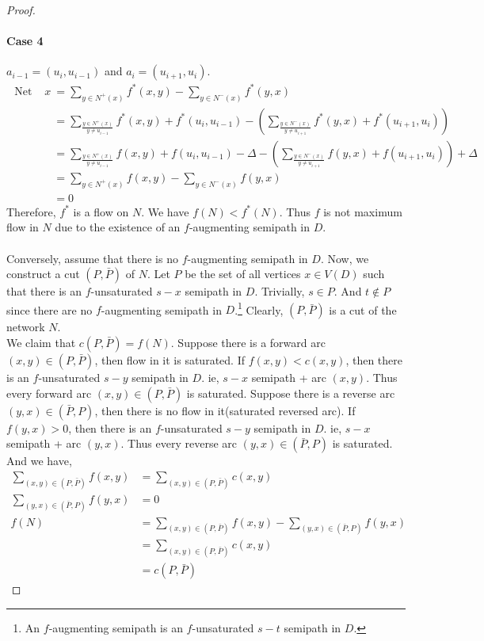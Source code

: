 \begin{proof}
	\paragraph{Case 4} $a_{i-1} = (u_i,u_{i-1})$ and $a_i = (u_{i+1},u_i)$.
	\begin{align*}
		\text{ Net flow out of } x
		& = \sum_{y \in N^+(x)} f^*(x,y) - \sum_{y \in N^-(x)} f^*(y,x) \\
		& = \sum_{\frac{y \in N^+(x)}{y \ne u_{i-1}}} f^*(x,y) + f^*(u_i,u_{i-1}) - \left( \sum_{\frac{y \in N^-(x)}{y \ne u_{i+1}}} f^*(y,x) + f^*(u_{i+1},u_i) \right)\\
		& = \sum_{\frac{y \in N^+(x)}{y \ne u_{i-1}}} f(x,y) + f(u_i,u_{i-1}) - \Delta - \left( \sum_{\frac{y \in N^-(x)}{y \ne u_{i+1}}} f(y,x) + f(u_{i+1},u_i) \right) + \Delta \\
		& = \sum_{y \in N^+(x)} f(x,y) - \sum_{y \in N^-(x)} f(y,x) \\
		& = 0
	\end{align*}
	Therefore, $f^*$ is a flow on $N$. We have $f(N) < f^*(N)$. Thus $f$ is not maximum flow in $N$ due to the existence of an $f$-augmenting semipath in $D$.

	\paragraph{}Conversely, assume that there is no $f$-augmenting semipath in $D$. Now, we construct a cut $(P,\bar{P})$ of $N$. Let $P$ be the set of all vertices $x \in V(D)$ such that there is an $f$-unsaturated $s-x$ semipath in $D$. Trivially, $s \in P$. And $t \not\in P$ since there are no $f$-augmenting semipath in $D$.\footnote{An $f$-augmenting semipath is an $f$-unsaturated $s-t$ semipath in $D$.} Clearly, $(P,\bar{P})$ is a cut of the network $N$.\\

	We claim that $c(P,\bar{P}) = f(N)$. Suppose there is a forward arc $(x,y) \in (P,\bar{P})$, then flow in it is saturated. If $f(x,y) < c(x,y)$, then there is an $f$-unsaturated $s-y$ semipath in $D$. ie, $s-x$ semipath + arc $(x,y)$. Thus every forward arc $(x,y) \in (P,\bar{P})$ is saturated. Suppose there is a reverse arc $(y,x) \in (\bar{P},P)$, then there is no flow in it(saturated reversed arc). If $f(y,x) > 0$, then there is an $f$-unsaturated $s-y$ semipath in $D$. ie, $s-x$ semipath + arc $(y,x)$. Thus every reverse arc $(y,x) \in (\bar{P},P)$ is saturated. And we have,
	\begin{align*}
		\sum_{(x,y) \in (P,\bar{P})} f(x,y) & = \sum_{(x,y) \in (P,\bar{P})} c(x,y) \\
		\sum_{(y,x) \in (\bar{P},P)} f(y,x) & = 0 \\
		f(N) & = \sum_{(x,y) \in (P,\bar{P})} f(x,y) - \sum_{(y,x) \in (\bar{P},P)} f(y,x) \\
		& = \sum_{(x,y) \in (P,\bar{P})} c(x,y) \\
		& = c(P,\bar{P})
	\end{align*}


\end{proof}
